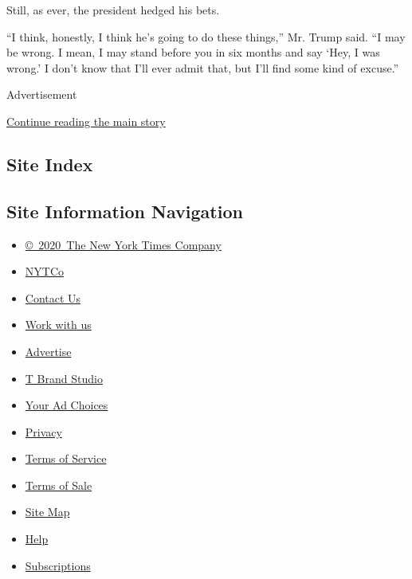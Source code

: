 Still, as ever, the president hedged his bets.

``I think, honestly, I think he's going to do these things,'' Mr. Trump
said. ``I may be wrong. I mean, I may stand before you in six months and
say `Hey, I was wrong.' I don't know that I'll ever admit that, but I'll
find some kind of excuse.''

Advertisement

\protect\hyperlink{after-bottom}{Continue reading the main story}

\hypertarget{site-index}{%
\subsection{Site Index}\label{site-index}}

\hypertarget{site-information-navigation}{%
\subsection{Site Information
Navigation}\label{site-information-navigation}}

\begin{itemize}
\tightlist
\item
  \href{https://help.nytimes.com/hc/en-us/articles/115014792127-Copyright-notice}{©~2020~The
  New York Times Company}
\end{itemize}

\begin{itemize}
\tightlist
\item
  \href{https://www.nytco.com/}{NYTCo}
\item
  \href{https://help.nytimes.com/hc/en-us/articles/115015385887-Contact-Us}{Contact
  Us}
\item
  \href{https://www.nytco.com/careers/}{Work with us}
\item
  \href{https://nytmediakit.com/}{Advertise}
\item
  \href{http://www.tbrandstudio.com/}{T Brand Studio}
\item
  \href{https://www.nytimes.com/privacy/cookie-policy\#how-do-i-manage-trackers}{Your
  Ad Choices}
\item
  \href{https://www.nytimes.com/privacy}{Privacy}
\item
  \href{https://help.nytimes.com/hc/en-us/articles/115014893428-Terms-of-service}{Terms
  of Service}
\item
  \href{https://help.nytimes.com/hc/en-us/articles/115014893968-Terms-of-sale}{Terms
  of Sale}
\item
  \href{https://spiderbites.nytimes.com}{Site Map}
\item
  \href{https://help.nytimes.com/hc/en-us}{Help}
\item
  \href{https://www.nytimes.com/subscription?campaignId=37WXW}{Subscriptions}
\end{itemize}
